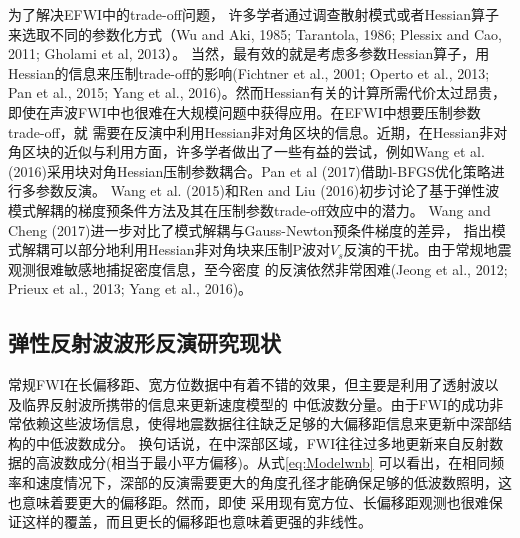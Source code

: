 为了解决EFWI中的trade-off问题，
许多学者通过调查散射模式或者Hessian算子来选取不同的参数化方式（Wu and Aki, 1985\cite{wu.aki:1985}; Tarantola, 1986\cite{tarantola:1986}; 
Plessix and Cao, 2011\cite{plessix.cao:2011}; Gholami et al, 2013\cite{gholami2013}）。
当然，最有效的就是考虑多参数Hessian算子，用Hessian的信息来压制trade-off的影响(Fichtner et al., 2001\cite{fichtner2011hessian}; Operto et al.,
2013\cite{operto2013guided}; Pan et al., 2015\cite{pan2015estimation}; Yang et al.,
2016\cite{Yang2016})。然而Hessian有关的计算所需代价太过昂贵，即使在声波FWI中也很难在大规模问题中获得应用。在EFWI中想要压制参数trade-off，就
需要在反演中利用Hessian非对角区块的信息。近期，在Hessian非对角区块的近似与利用方面，许多学者做出了一些有益的尝试，例如Wang
et al. (2016)\cite{WangYuweiEtAl2016}采用块对角Hessian压制参数耦合。Pan et
al (2017)\cite{PanEtAl2017}借助l-BFGS优化策略进行多参数反演。
Wang et al. (2015)\cite{wang:2015}和Ren and                                                                           
Liu
(2016)\cite{ren.liu:2016}初步讨论了基于弹性波模式解耦的梯度预条件方法及其在压制参数trade-off效应中的潜力。
Wang and Cheng (2017)\cite{WangEtAl2017}进一步对比了模式解耦与Gauss-Newton预条件梯度的差异，
指出模式解耦可以部分地利用Hessian非对角块来压制P波对$V_s$反演的干扰。由于常规地震观测很难敏感地捕捉密度信息，至今密度
的反演依然非常困难(Jeong et al., 2012\cite{jeong2012full}; Prieux et al., 2013\cite{prieux:2013a}; Yang
et al., 2016\cite{Yang2016})。
\subsection{弹性反射波波形反演研究现状}
常规FWI在长偏移距、宽方位数据中有着不错的效果，但主要是利用了透射波以及临界反射波所携带的信息来更新速度模型的
中低波数分量。由于FWI的成功非常依赖这些波场信息，使得地震数据往往缺乏足够的大偏移距信息来更新中深部结构的中低波数成分。
换句话说，在中深部区域，FWI往往过多地更新来自反射数据的高波数成分(相当于最小平方偏移)。从式\eqref{eq:Modelwnb}
可以看出，在相同频率和速度情况下，深部的反演需要更大的角度孔径才能确保足够的低波数照明，这也意味着要更大的偏移距。然而，即使
采用现有宽方位、长偏移距观测也很难保证这样的覆盖，而且更长的偏移距也意味着更强的非线性\cite{sirgue2006importance,virieux2009overview}。


